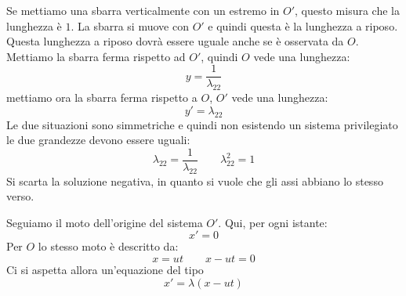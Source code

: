 Se mettiamo una sbarra verticalmente con un estremo in $O'$, questo misura che la lunghezza è $1$. La sbarra si muove con $O'$ e quindi questa è la lunghezza a riposo. Questa lunghezza a riposo dovrà essere uguale anche se è osservata da $O$. Mettiamo la sbarra ferma rispetto ad $O'$, quindi $O$ vede una lunghezza:
\[y=\frac{1}{\lambda_{22}}\]
mettiamo ora la sbarra ferma rispetto a $O$, $O'$ vede una lunghezza:
\[y'=\lambda_{22}\]
Le due situazioni sono simmetriche e quindi non esistendo un sistema privilegiato le due grandezze devono essere uguali:
\[\lambda_{22}=\frac{1}{\lambda_{22}}\qquad\lambda^2_{22}=1\]
Si scarta la soluzione negativa, in quanto si vuole che gli assi abbiano lo stesso verso.


\parbox[]{\textwidth}{
Seguiamo il moto dell'origine del sistema $O'$. Qui, per ogni istante:
\[x'=0\]
Per $O$ lo stesso moto è descritto da:
\[x=ut\qquad x-ut=0\]
Ci si aspetta allora un'equazione del tipo
\[x'=\lambda(x-ut)\]
}

